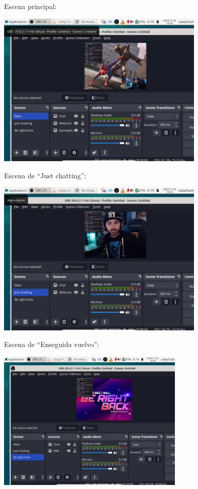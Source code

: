\documentclass[spanish]{article}
\begin{document}
Escena principal:

\begin{center}

\includegraphics[width=10cm]{../img/7.png}
\end{center}

Escena de ``Just chatting'':

\begin{center}
\includegraphics[width=10cm]{../img/8.png}
\end{center}

\newpage

Escena de ``Enseguida vuelvo'':
\begin{center}
\includegraphics[width=9cm]{../img/9.png}
\end{center}
\end{document}
